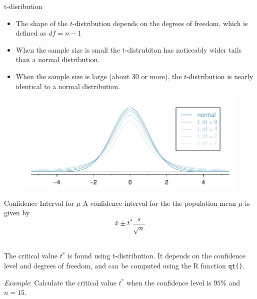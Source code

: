 \documentclass[fleqn, 10pt]{beamer}\usepackage[]{graphicx}\usepackage[]{color}
\begin{document}
\begin{frame}{t-disribution}
\begin{itemize}
\item The shape of the $t$-distribution depends on the degrees of freedom, which is defined as $df = n-1$
\item When the sample size is small the $t$-distrubiton has noticeably wider tails than a normal distribution.
\item When the sample size is large (about 30 or more), the $t$-distribution is nearly identical to a normal distribution.
\end{itemize}
\begin{figure}
\includegraphics[scale = 0.5]{figure/tDistConvergeToNormalDist.pdf}
\end{figure}
\end{frame}

\begin{frame}{Confidence Interval for $\mu$}
A confidence interval for the the population mean $\mu$ is given by 
$$\bar{x} \pm t^* \frac{s}{\sqrt{n}}$$\\
\vspace{1cm}

The critical value $t^*$ is found using $t$-distribution.  It depends on the confidence level and degrees of freedom, and can be computed using the R function \texttt{qt()}.\\
\bigskip

\emph{Example}: Calculate the critical value $t^*$ when the confidence level is $95\%$ and $n=15$.
\vspace{2cm}

\end{frame}
\end{document}
